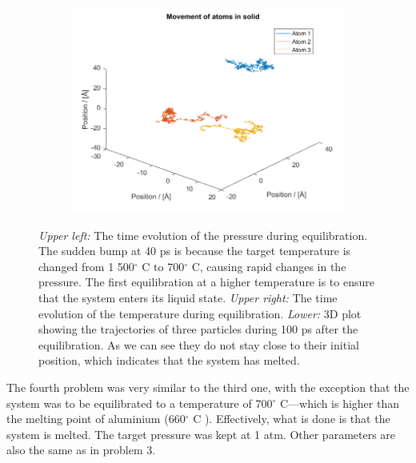 \begin{figure}[H]
\begin{subfigure}[b]{0.40\textwidth}
    \end{subfigure}
    \begin{subfigure}[b]{0.40\textwidth}
        \centering
        \includegraphics[width=\textwidth]{graphics/task4/traj.png}
    \end{subfigure}
    \caption{\textit{Upper left:} The time evolution of the pressure during equilibration. The sudden bump at 40 ps is because the target temperature is changed from 1 500$^\circ$ C to 700$^\circ$ C, causing rapid changes in the pressure. The first equilibration at a higher temperature is to ensure that the system enters its liquid state. \textit{Upper right:} The time evolution of the temperature during equilibration. \textit{Lower:} 3D plot showing the trajectories of three particles during 100 ps after the equilibration. As we can see they do not stay close to their initial position, which indicates that the system has melted.}
    \label{fig:equilibrium700}
\end{figure}

The fourth problem was very similar to the third one, with the exception that the system was to be equilibrated to a temperature of 700$^\circ$ C---which is higher than the melting point of aluminium (660$^\circ$ C \cite{wiki-al}). Effectively, what is done is that the system is melted. The target pressure was kept at 1 atm. Other parameters are also the same as in problem 3.

